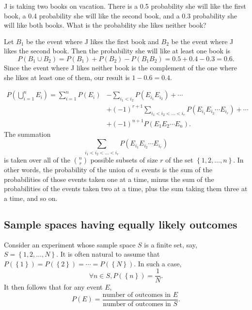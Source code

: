 \begin{changebar}
\begin{example}
    J is taking two books on vacation. There is a 0.5 probability she will like the first book, a 0.4 probability she will like the second book, and a 0.3 probability she will like both books. What is the probability she likes neither book?
\end{example}
\begin{solution}
    Let $B_1$ be the event where J likes the first book and $B_2$ be the event where J likes the second book. Then the probability she will like at least one book is \[
        P(B_1 \cup B_2) = P(B_1) + P(B_2) - P(B_1B_2) = 0.5 + 0.4 - 0.3 = 0.6.    
    \] Since the event where J likes neither book is the complement of the one where she likes at least one of them, our result is $1 - 0.6 = 0.4$.
\end{solution}
\end{changebar}

\begin{proposition}
    \[\begin{aligned}
        P\left(\bigcup^n_{i=1} E_i\right) = \sum^n_{i=1} P(E_i) &- \sum_{i_1 < i_2} P(E_{i_1}E_{i_2}) + \cdots \\ &+ (-1)^{r+1}\sum_{i_1 < i_2 < \dots < i_r} P(E_{i_1}E_{i_2}\cdots E_{i_r}) + \cdots \\ &+ (-1)^{n+1}P(E_1E_2\cdots E_n).
    \end{aligned}\]
    The summation \[
        \sum_{i_1 < i_2 < \dots < i_r} P(E_{i_1}E_{i_2}\cdots E_{i_r})
    \] is taken over all of the $\binom{n}{r}$ possible subsets of size $r$ of the set $\left\{ 1, 2, \dots, n \right\}$. In other words, the probability of the union of $n$ events is the sum of the probabilities of those events taken one at a time, minus the sum of the probabilities of the events taken two at a time, plus the sum taking them three at a time, and so on.
\end{proposition}
\pagebreak
\subsection{Sample spaces having equally likely outcomes}
Consider an experiment whose sample space $S$ is a finite set, say, $S = \left\{ 1, 2, \dots, N \right\}$. It is often natural to assume that $P(\left\{ 1 \right\}) = P(\left\{ 2 \right\}) = \cdots = P(\left\{ N \right\})$. In such a case, \[
    \forall n \in S, P(\left\{ n \right\}) = \frac{1}{N}.
\] It then follows that for any event $E$, \[
    P(E) = \frac{\text{number of outcomes in $E$}}{\text{number of outcomes in $S$}}.    
\]

